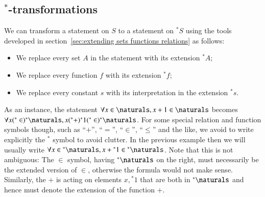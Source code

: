 \documentclass[adraft, copyright,creativecommons,sharealike,noncommercial]{eptcs}
\newcommand{\nstar}{{^*}}
\begin{document}
\subsection{$\nstar$-transformations}
%
We can transform a statement on $S$ to a statement on $\nstar S$ using the tools developed in section~\ref{sec:extending sets functions relations} as follows:
\begin{itemize}
	\item We replace every set $A$ in the statement with its extension $\nstar A$;
	\item We replace every function $f$ with its extension $\nstar f$;
	\item We replace every constant $s$ with its interpretation in the extension $\nstar s$.
\end{itemize}
%
As an instance, the statement $\forall x \in \naturals, x+1 \in \naturals$ becomes $\forall x (\nstar\in) \nstar \naturals, x(\nstar+)\nstar 1 (\nstar \in )\nstar \naturals$. For some special relation and function symbols though, such as ``$+$'', ``$=$'', ``$\in$'', ``$\leq$'' and the like, we avoid to write explicitly the $\nstar$ symbol to avoid clutter. In the previous example then we will usually write $\forall x \in \nstar \naturals, x+\nstar 1 \in \nstar \naturals$. Note that this is not ambiguous: The $\in$ symbol, having $\nstar \naturals$ on the right, must necessarily be the extended version of $\in$, otherwise the formula would not make sense. Similarly, the $+$ is acting on elements $x, \nstar 1$ that are both in $\nstar \naturals$ and hence must denote the extension of the function $+$.
\end{document}
